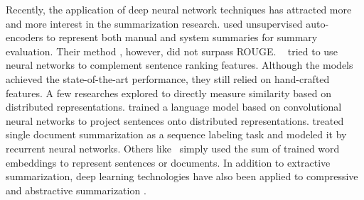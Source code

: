 \documentclass[letterpaper]{article}
\begin{document}
Recently, the application of deep neural network techniques has attracted more and more interest in the summarization research.
\cite{genest2011deep} used unsupervised auto-encoders to represent both manual and system summaries for summary evaluation.
Their method , however, did not surpass ROUGE.
~\cite{cao2015ranking,cao2015learning} tried to use neural networks to complement sentence ranking features.
Although the models achieved the state-of-the-art performance, they still relied on hand-crafted features.
A few researches explored to directly measure similarity based on distributed representations.
\cite{yin2015optimizing} trained a language model based on convolutional neural networks to project sentences onto distributed representations.
\cite{cheng2016neural} treated single document summarization as a sequence labeling task and modeled it by recurrent neural networks.
Others like~\cite{kobayashi-noguchi-yatsuka:2015:EMNLP} simply used the sum of trained word embeddings to represent sentences or documents.
In addition to extractive summarization, deep learning technologies have also been applied to compressive and abstractive summarization \cite{filippova-EtAl:2015:EMNLP,rush-chopra-weston:2015:EMNLP}.
\end{document}
